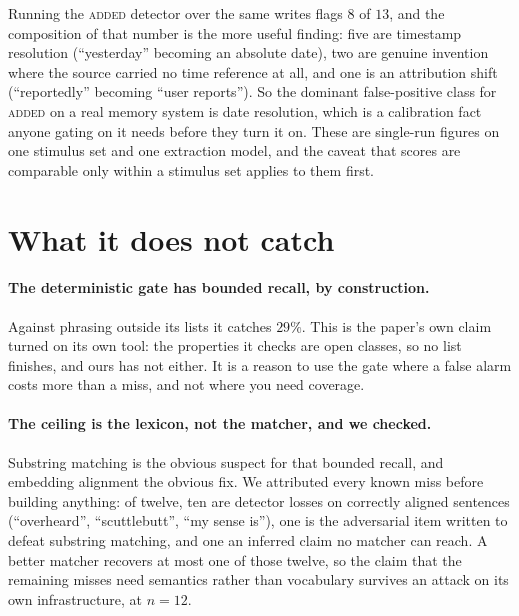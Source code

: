 \documentclass[11pt]{article}
\begin{document}
Running the \textsc{added} detector over the same writes flags $8$ of $13$, and the
composition of that number is the more useful finding: five are timestamp resolution
(``yesterday'' becoming an absolute date), two are genuine invention where the source
carried no time reference at all, and one is an attribution shift (``reportedly''
becoming ``user reports''). So the dominant false-positive class for \textsc{added} on
a real memory system is date resolution, which is a calibration fact anyone gating on
it needs before they turn it on. These are single-run figures on one stimulus set and
one extraction model, and the caveat that scores are comparable only within a stimulus
set applies to them first.

\section{What it does not catch}
\label{sec:limits}

\paragraph{The deterministic gate has bounded recall, by construction.}
Against phrasing outside its lists it catches $29\%$. This is the paper's own claim turned
on its own tool: the properties it checks are open classes, so no list finishes, and ours
has not either. It is a reason to use the gate where a false alarm costs more than a miss,
and not where you need coverage.

\paragraph{The ceiling is the lexicon, not the matcher, and we checked.} Substring
matching is the obvious suspect for that bounded recall, and embedding alignment the
obvious fix. We attributed every known miss before building anything: of twelve, ten are
detector losses on correctly aligned sentences (``overheard'', ``scuttlebutt'', ``my
sense is''), one is the adversarial item written to defeat substring matching, and one
an inferred claim no matcher can reach. A better matcher recovers at most one of those
twelve, so the claim that the remaining misses need semantics rather than vocabulary
survives an attack on its own infrastructure, at $n=12$.
\end{document}
